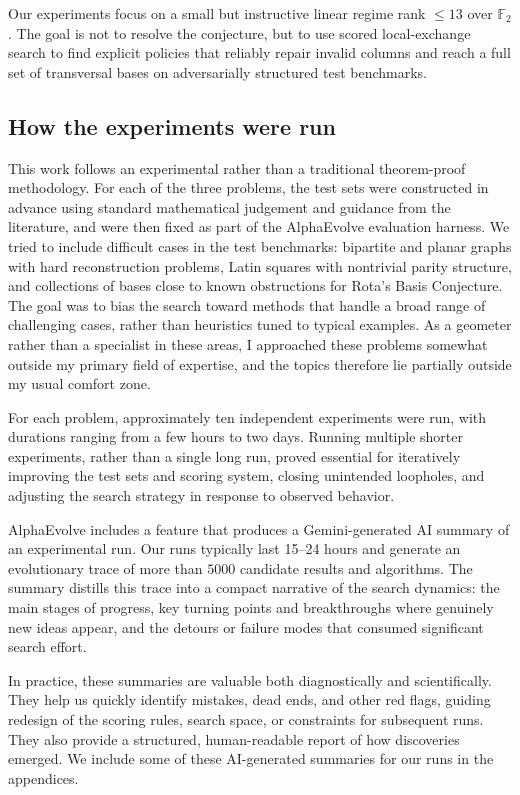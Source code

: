 \documentclass[11pt]{amsart}
\begin{document}
Our experiments focus on a small but instructive linear regime rank $\le 13$ over $\mathbb{F}_2$. The goal is not to resolve the conjecture, but to use scored local-exchange search to find explicit policies that reliably repair invalid columns and reach a full set of transversal bases on adversarially structured test benchmarks.

\subsection{How the experiments were run}

This work follows an experimental rather than a traditional theorem-proof methodology. 
For each of the three problems, the test sets were constructed in advance using standard mathematical judgement and guidance from the literature, and were then fixed as part of the AlphaEvolve evaluation harness. We tried to include difficult cases in the test benchmarks: bipartite and planar graphs with hard reconstruction problems, Latin squares with nontrivial parity structure, and collections of bases close to known obstructions for Rota’s Basis Conjecture. The goal was to bias the search toward methods that handle a broad range of challenging cases, rather than heuristics tuned to typical examples.
As a geometer rather than a specialist in these areas, I approached these problems somewhat outside my primary field of expertise, and the topics therefore lie partially outside my usual comfort zone.

For each problem, approximately ten independent experiments were run, with durations ranging from a few hours to two days. Running multiple shorter experiments, rather than a single long run, proved essential for iteratively improving the test sets and scoring system, closing unintended loopholes, and adjusting the search strategy in response to observed behavior.

AlphaEvolve includes a feature that produces a Gemini-generated AI summary of an experimental run. Our runs typically last 15–24 hours and generate an evolutionary trace of more than $5000$ candidate results and algorithms. The summary distills this trace into a compact narrative of the search dynamics: the main stages of progress, key turning points and breakthroughs where genuinely new ideas appear, and the detours or failure modes that consumed significant search effort.

In practice, these summaries are valuable both diagnostically and scientifically. They help us quickly identify mistakes, dead ends, and other red flags, guiding redesign of the scoring rules, search space, or constraints for subsequent runs. They also provide a structured, human-readable report of how discoveries emerged. We include some of these AI-generated summaries for our runs in the appendices.
\end{document}
